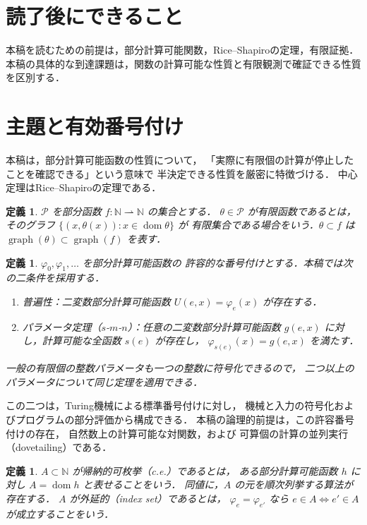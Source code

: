 \documentclass[a5paper,10pt,onecolumn]{jsarticle}
\theoremstyle{mathnotetheorem}
\newtheorem{definition}[theorem]{定義}
\begin{document}
\section*{読了後にできること}
本稿を読むための前提は，部分計算可能関数，Rice--Shapiroの定理，有限証拠．
本稿の具体的な到達課題は，関数の計算可能な性質と有限観測で確証できる性質を区別する．

\section{主題と有効番号付け}
本稿は，部分計算可能函数の性質について，
「実際に有限個の計算が停止したことを確認できる」という意味で
半決定できる性質を厳密に特徴づける．
中心定理はRice--Shapiroの定理である．

\begin{definition}
$\mathcal P$ を部分函数 $f:\mathbb N\rightharpoonup\mathbb N$ の集合とする．
$\theta\in\mathcal P$ が\emph{有限函数}であるとは，
そのグラフ $\{(x,\theta(x)):x\in\operatorname{dom}\theta\}$ が
有限集合である場合をいう．$\theta\subset f$ は
$\operatorname{graph}(\theta)\subset\operatorname{graph}(f)$ を表す．
\end{definition}

\begin{definition}
$\varphi_0,\varphi_1,\ldots$ を部分計算可能函数の
\emph{許容的な番号付け}とする．本稿では次の二条件を採用する．
\begin{enumerate}
\item \emph{普遍性}：二変数部分計算可能函数
$U(e,x)=\varphi_e(x)$ が存在する．
\item \emph{パラメータ定理（$s$-$m$-$n$）}：任意の二変数部分計算可能函数
$g(e,x)$ に対し，計算可能な全函数 $s(e)$ が存在し，
$\varphi_{s(e)}(x)=g(e,x)$ を満たす．
\end{enumerate}
一般の有限個の整数パラメータも一つの整数に符号化できるので，
二つ以上のパラメータについて同じ定理を適用できる．
\end{definition}

この二つは，Turing機械による標準番号付けに対し，
機械と入力の符号化およびプログラムの部分評価から構成できる．
本稿の論理的前提は，この許容番号付けの存在，
自然数上の計算可能な対関数，および
可算個の計算の並列実行（dovetailing）である．

\begin{definition}
$A\subset\mathbb N$ が\emph{帰納的可枚挙}（c.e.）であるとは，
ある部分計算可能函数 $h$ に対し
$A=\operatorname{dom}h$ と表せることをいう．
同値に，$A$ の元を順次列挙する算法が存在する．
$A$ が\emph{外延的}（index set）であるとは，
$\varphi_e=\varphi_{e'}$ なら
$e\in A\Longleftrightarrow e'\in A$ が成立することをいう．
\end{definition}
\end{document}
